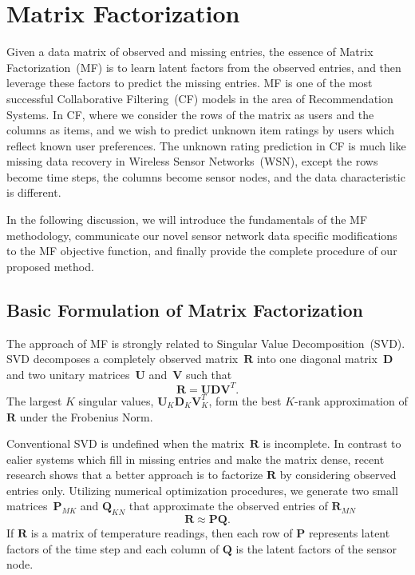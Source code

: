 \section{Matrix Factorization}  \label{sec:mf}

Given a data matrix of observed and missing entries, the essence of Matrix Factorization~(MF) is to learn latent factors from the observed entries, and then leverage these factors to predict the missing entries.
MF is one of the most successful Collaborative Filtering~(CF) models in the area of Recommendation Systems.
In CF, where we consider the rows of the matrix as users and the columns as items, and we wish to predict unknown item ratings by users which reflect known user preferences.
The unknown rating prediction in CF is much like missing data recovery in Wireless Sensor Networks~(WSN), except the rows become time steps, the columns become sensor nodes, and the data characteristic is different. 

In the following discussion, we will introduce the fundamentals of the MF methodology, communicate our novel sensor network data specific modifications to the MF objective function, and finally provide the complete procedure of our proposed method.

\subsection{Basic Formulation of Matrix Factorization}

The approach of MF is strongly related to Singular Value Decomposition~(SVD).
SVD decomposes a completely observed matrix~$\mathbf{R}$ into one diagonal matrix~$\mathbf{D}$ and two unitary matrices~$\mathbf{U}$ and~$\mathbf{V}$ such that
\begin{equation*} \mathbf{R} = \mathbf{U}\mathbf{D}\mathbf{V}^T. \end{equation*}
The largest $K$ singular values, $\mathbf{U}_K \mathbf{D}_K \mathbf{V}_K^T$, form the best $K$-rank approximation of $\mathbf{R}$ under the Frobenius Norm. 

Conventional SVD is undefined when the matrix~$\mathbf{R}$ is incomplete.
In contrast to ealier systems which fill in missing entries and make the matrix dense, recent research shows\cite{koren2009matrix} that a better approach is to factorize $\mathbf{R}$ by considering observed entries only.
Utilizing numerical optimization procedures, we generate two small matrices~$\mathbf{P}_{MK}$ and $\mathbf{Q}_{KN}$ that approximate the observed entries of $\mathbf{R}_{MN}$
\begin{equation*}\mathbf{R} \approx \mathbf{P} \mathbf{Q}.\end{equation*}
If $\mathbf{R}$ is a matrix of temperature readings, then each row of $\mathbf{P}$ represents latent factors of the time step and each column of $\mathbf{Q}$ is the latent factors of the sensor node.


